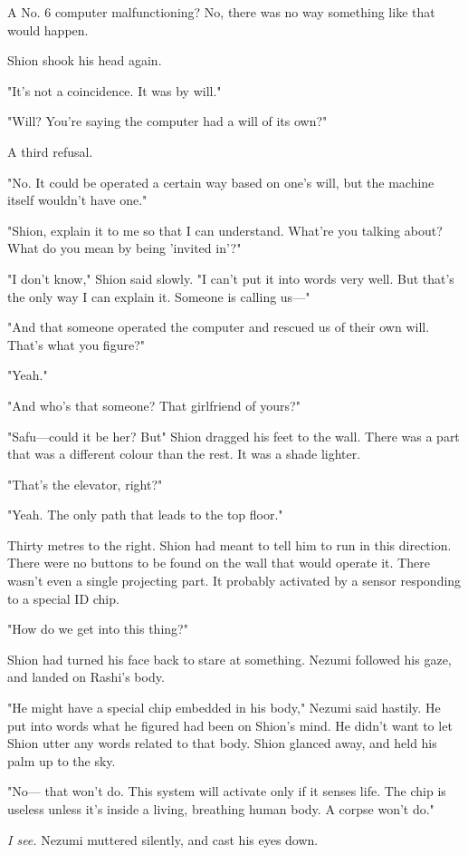 A No. 6 computer malfunctioning? No, there was no way something like
that would happen.

Shion shook his head again.

"It's not a coincidence. It was by will."

"Will? You're saying the computer had a will of its own?"

A third refusal.

"No. It could be operated a certain way based on one's will, but the
machine itself wouldn't have one."

"Shion, explain it to me so that I can understand. What're you talking
about? What do you mean by being 'invited in'?"

"I don't know," Shion said slowly. "I can't put it into words very well.
But that's the only way I can explain it. Someone is calling us---"

"And that someone operated the computer and rescued us of their own
will. That's what you figure?"

"Yeah."

"And who's that someone? That girlfriend of yours?"

"Safu---could it be her? But\el " Shion dragged his feet to the wall. There
was a part that was a different colour than the rest. It was a shade
lighter.

"That's the elevator, right?"

"Yeah. The only path that leads to the top floor."

Thirty metres to the right. Shion had meant to tell him to run in this
direction. There were no buttons to be found on the wall that would
operate it. There wasn't even a single projecting part. It probably
activated by a sensor responding to a special ID chip.

"How do we get into this thing?"

Shion had turned his face back to stare at something. Nezumi followed
his gaze, and landed on Rashi's body.

"He might have a special chip embedded in his body," Nezumi said
hastily. He put into words what he figured had been on Shion's mind. He
didn't want to let Shion utter any words related to that body. Shion
glanced away, and held his palm up to the sky.

"No--- that won't do. This system will activate only if it senses life.
The chip is useless unless it's inside a living, breathing human body. A
corpse won't do."

\emph{I see.} Nezumi muttered silently, and cast his eyes down.

